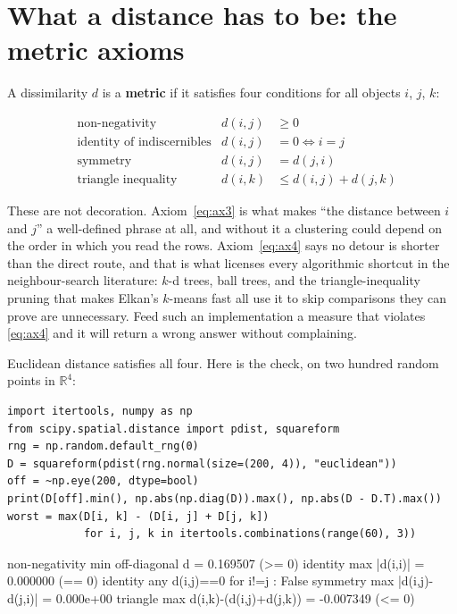 \documentclass[11pt]{article}
\begin{document}
\section{What a distance has to be: the metric axioms}
\label{sec:axioms}

A dissimilarity $d$ is a \textbf{metric} if it satisfies four conditions for
all objects $i$, $j$, $k$:

\begin{align}
  &\text{non-negativity} & d(i,j) &\ge 0 \label{eq:ax1}\\
  &\text{identity of indiscernibles} & d(i,j) &= 0 \iff i = j \label{eq:ax2}\\
  &\text{symmetry} & d(i,j) &= d(j,i) \label{eq:ax3}\\
  &\text{triangle inequality} & d(i,k) &\le d(i,j) + d(j,k) \label{eq:ax4}
\end{align}

These are not decoration. Axiom~\eqref{eq:ax3} is what makes ``the distance
between $i$ and $j$'' a well-defined phrase at all, and without it a
clustering could depend on the order in which you read the rows.
Axiom~\eqref{eq:ax4} says no detour is shorter than the direct route, and
that is what licenses every algorithmic shortcut in the neighbour-search
literature: $k$-d trees, ball trees, and the triangle-inequality pruning that
makes Elkan's $k$-means fast all use it to skip comparisons they can prove
are unnecessary. Feed such an implementation a measure that violates
\eqref{eq:ax4} and it will return a wrong answer without complaining.

Euclidean distance satisfies all four. Here is the check, on two hundred
random points in $\mathbb{R}^4$:

\begin{lstlisting}
import itertools, numpy as np
from scipy.spatial.distance import pdist, squareform
rng = np.random.default_rng(0)
D = squareform(pdist(rng.normal(size=(200, 4)), "euclidean"))
off = ~np.eye(200, dtype=bool)
print(D[off].min(), np.abs(np.diag(D)).max(), np.abs(D - D.T).max())
worst = max(D[i, k] - (D[i, j] + D[j, k])
            for i, j, k in itertools.combinations(range(60), 3))
\end{lstlisting}
\begin{codeout}
non-negativity   min off-diagonal d = 0.169507  (>= 0)
identity         max |d(i,i)|        = 0.000000  (== 0)
identity         any d(i,j)==0 for i!=j : False
symmetry         max |d(i,j)-d(j,i)| = 0.000e+00
triangle         max d(i,k)-(d(i,j)+d(j,k)) = -0.007349  (<= 0)
\end{codeout}
\end{document}
